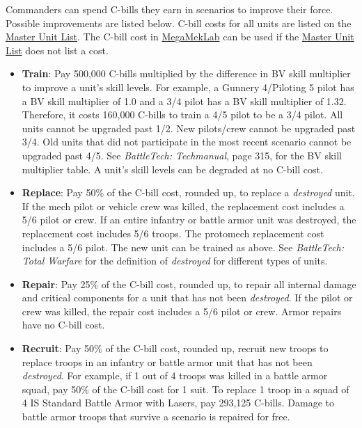 \documentclass{article}
\begin{document}
Commanders can spend C-bills they earn in scenarios to improve their force.
Possible improvements are listed below.
C-bill costs for all units are listed on the \href{http://www.masterunitlist.info}{Master Unit List}.
The C-bill cost in \href{https://megamek.org}{MegaMekLab} can be used if the \href{http://www.masterunitlist.info}{Master Unit List} does not list a cost.

\begin{itemize}

\item {\bf Train}: Pay 500,000 C-bills multiplied by the difference in BV skill multiplier to improve a unit's skill levels.
For example, a Gunnery 4/Piloting 5 pilot has a BV skill multiplier of 1.0 and a 3/4 pilot has a BV skill multiplier of 1.32.
Therefore, it costs 160,000 C-bills to train a 4/5 pilot to be a 3/4 pilot.
All units cannot be upgraded past 1/2.
New pilots/crew cannot be upgraded past 3/4.
Old units that did not participate in the most recent scenario cannot be upgraded past 4/5.
See \emph{BattleTech: Techmanual}, page 315, for the BV skill multiplier table.
A unit's skill levels can be degraded at no C-bill cost.

\item {\bf Replace}: Pay 50\% of the C-bill cost, rounded up, to replace a \emph{destroyed} unit.
If the mech pilot or vehicle crew was killed, the replacement cost includes a 5/6 pilot or crew.
If an entire infantry or battle armor unit was destroyed, the replacement cost includes 5/6 troops.
The protomech replacement cost includes a 5/6 pilot.
The new unit can be trained as above.
See \emph{BattleTech: Total Warfare} for the definition of \emph{destroyed} for different types of units.

\item {\bf Repair}: Pay 25\% of the C-bill cost, rounded up, to repair all internal damage and critical components for a unit that has not been \emph{destroyed}.
If the pilot or crew was killed, the repair cost includes a 5/6 pilot or crew.
Armor repairs have no C-bill cost.

\item {\bf Recruit}: Pay 50\% of the C-bill cost, rounded up, recruit new troops to replace troops in an infantry or battle armor unit that has not been \emph{destroyed}.
For example, if 1 out of 4 troops was killed in a battle armor squad, pay 50\% of the C-bill cost for 1 suit.
To replace 1 troop in a squad of 4 IS Standard Battle Armor with Lasers, pay 293,125 C-bills.
Damage to battle armor troops that survive a scenario is repaired for free.


\end{itemize}
\end{document}
